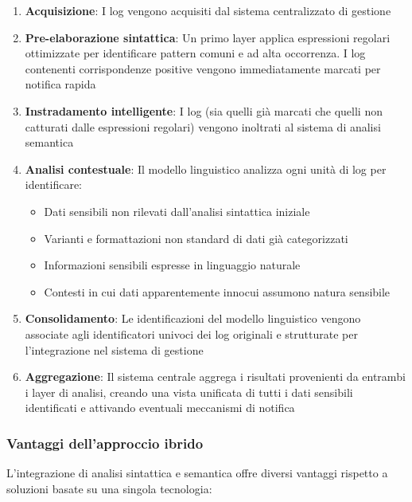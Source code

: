 \documentclass[12pt]{report}
\begin{document}
\begin{enumerate}
    \item \textbf{Acquisizione}: I log vengono acquisiti dal sistema centralizzato di gestione

    \item \textbf{Pre-elaborazione sintattica}: Un primo layer applica espressioni regolari ottimizzate per identificare pattern comuni e ad alta occorrenza. I log contenenti corrispondenze positive vengono immediatamente marcati per notifica rapida

    \item \textbf{Instradamento intelligente}: I log (sia quelli già marcati che quelli non catturati dalle espressioni regolari) vengono inoltrati al sistema di analisi semantica

    \item \textbf{Analisi contestuale}: Il modello linguistico analizza ogni unità di log per identificare:
    \begin{itemize}
        \item Dati sensibili non rilevati dall'analisi sintattica iniziale
        \item Varianti e formattazioni non standard di dati già categorizzati
        \item Informazioni sensibili espresse in linguaggio naturale
        \item Contesti in cui dati apparentemente innocui assumono natura sensibile
    \end{itemize}

    \item \textbf{Consolidamento}: Le identificazioni del modello linguistico vengono associate agli identificatori univoci dei log originali e strutturate per l'integrazione nel sistema di gestione

    \item \textbf{Aggregazione}: Il sistema centrale aggrega i risultati provenienti da entrambi i layer di analisi, creando una vista unificata di tutti i dati sensibili identificati e attivando eventuali meccanismi di notifica
\end{enumerate}

\subsubsection{Vantaggi dell'approccio ibrido}

L'integrazione di analisi sintattica e semantica offre diversi vantaggi rispetto a soluzioni basate su una singola tecnologia:
\end{document}
